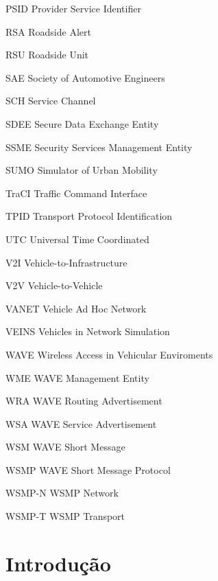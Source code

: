 \documentclass[
12pt,				%
openright,			%
oneside,			%
a4paper,			%
brazil,				%
]{abntex2}
\begin{document}
\begin{siglas}
		\item[PSID] Provider Service Identifier
		\item[RSA] Roadside Alert
		\item[RSU] Roadside Unit 	
		\item[SAE] Society of Automotive Engineers
		\item[SCH] Service Channel 
		\item[SDEE] Secure Data Exchange Entity
		\item[SSME] Security Services Management Entity
		\item[SUMO] Simulator of Urban Mobility
		\item[TraCI] Traffic Command Interface 
		\item[TPID] Transport Protocol Identification
		\item[UTC] Universal Time Coordinated
		\item[V2I] Vehicle-to-Infrastructure 
		\item[V2V] Vehicle-to-Vehicle 
		\item[VANET] Vehicle Ad Hoc Network 
		\item[VEINS] Vehicles in Network Simulation 
		\item[WAVE] Wireless Access in Vehicular Enviroments
		\item[WME] WAVE Management Entity 
		\item[WRA] WAVE Routing Advertisement 
		\item[WSA] WAVE Service Advertisement
		\item[WSM] WAVE Short Message
		\item[WSMP] WAVE Short Message Protocol
		\item[WSMP-N] WSMP Network 
		\item[WSMP-T] WSMP Transport
		
		
	\end{siglas}
	
	\tableofcontents*
	\cleardoublepage
	
	
	
	
	\textual
	
	\chapter[Introdução]{Introdução}
\end{document}
